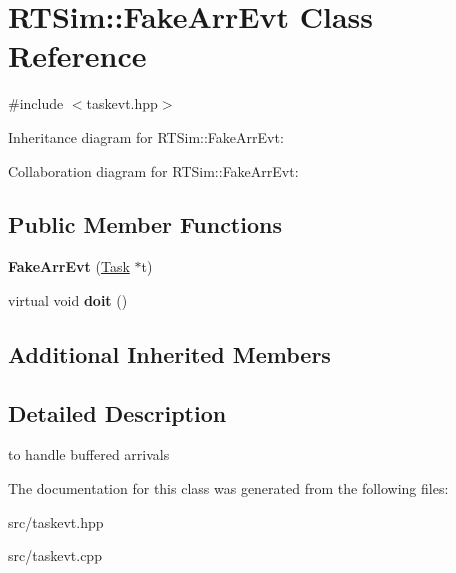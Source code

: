 \hypertarget{classRTSim_1_1FakeArrEvt}{}\section{R\+T\+Sim\+:\+:Fake\+Arr\+Evt Class Reference}
\label{classRTSim_1_1FakeArrEvt}


{\ttfamily \#include $<$taskevt.\+hpp$>$}



Inheritance diagram for R\+T\+Sim\+:\+:Fake\+Arr\+Evt\+:


Collaboration diagram for R\+T\+Sim\+:\+:Fake\+Arr\+Evt\+:
\subsection*{Public Member Functions}
\begin{DoxyCompactItemize}
\item 
{\bfseries Fake\+Arr\+Evt} (\hyperlink{classRTSim_1_1Task}{Task} $\ast$t)
\item 
virtual void {\bfseries doit} ()
\end{DoxyCompactItemize}
\subsection*{Additional Inherited Members}


\subsection{Detailed Description}
to handle buffered arrivals 

The documentation for this class was generated from the following files\+:\begin{DoxyCompactItemize}
\item 
src/taskevt.\+hpp\item 
src/taskevt.\+cpp\end{DoxyCompactItemize}
